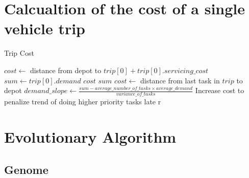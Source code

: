 
\section{Calcualtion of the cost of a single vehicle trip} %
\label{sec:calcualtion_of_the_cost_of_a_single_vehicle_trip}

\begin{algorithm}[thbp]
\caption{Trip Cost}\label{trip-cost-pseudocode}
\begin{algorithmic}[1]

	\State $cost \leftarrow$ distance from depot to $trip[0] + trip[0].servicing\_cost$
	\State $sum \leftarrow trip[0].demand$
		\State $cost$
		\State $sum$
	\EndFor
	\State $cost \leftarrow$ distance from last task in $trip$ to depot
	\State $demand\_slope \leftarrow \frac{sum - average\_number\_of\_tasks \times average\_demand}{variance\_of\_tasks}$
		\State Increase cost to penalize trend of doing higher priority tasks late
r	\EndIf
\EndProcedure

\end{algorithmic}
\end{algorithm}



\section{Evolutionary Algorithm} %
\label{sec:evolutionary_algorithm}

\subsection{Genome} %
\label{sub:genome}




